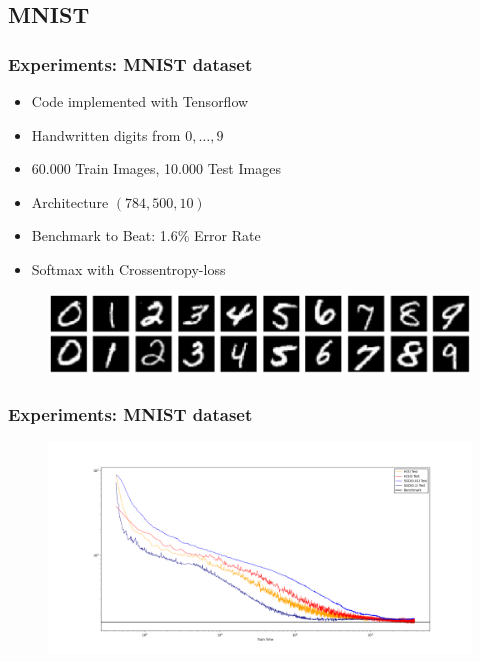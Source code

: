 \subsection{MNIST}
\begin{frame}
\frametitle{Experiments: MNIST dataset}
\begin{itemize}
\item[] Code implemented with Tensorflow
\item[] Handwritten digits from $0,\ldots,9$
\item[] 60.000 Train Images, 10.000 Test Images 
\item[] Architecture $(784,500,10)$
\item[] Benchmark to Beat: 1.6\% Error Rate
\item[] Softmax with Crossentropy-loss
\end{itemize}
\begin{figure}[h]      
	\centering      
	\hspace*{-0.6cm}
	\includegraphics[scale=0.4, trim={40, 0, 0, 0}]{Bilder/MNIST_Data}    
\end{figure}
\end{frame}

\begin{frame}
\frametitle{Experiments: MNIST dataset}
\begin{figure}[h]      
	\centering      
	\hspace*{-0.6cm}
	\includegraphics[scale=0.26, trim={50, 0, 0, 50}]{Bilder/Figure_1}    
\end{figure}
\end{frame}


